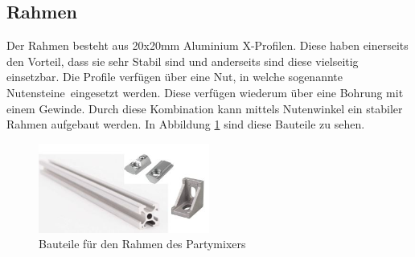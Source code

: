 \subsection{Rahmen}
\label{subsec:Rahmen}

Der Rahmen besteht aus 20x20mm Aluminium X-Profilen. Diese haben einerseits den Vorteil, dass sie sehr Stabil sind und anderseits sind diese vielseitig einsetzbar. Die Profile verfügen über eine Nut, in welche sogenannte \flqq Nutensteine\frqq~eingesetzt werden. Diese verfügen wiederum über eine Bohrung mit einem Gewinde. Durch diese Kombination kann mittels Nutenwinkel ein stabiler Rahmen aufgebaut werden. In Abbildung \ref{fig:Rahmen} sind diese Bauteile zu sehen.  

\begin{figure}[H]
	\centering
	\includegraphics[width=0.5\textwidth]{graphics/Rahmen}
	\caption{Bauteile für den Rahmen des Partymixers \cite{cnccanen_store_us_nodate}\cite{lientec-led_nutenstein_nodate}\cite{led-glass_l-form_nodate}}
	\label{fig:Rahmen}
\end{figure}